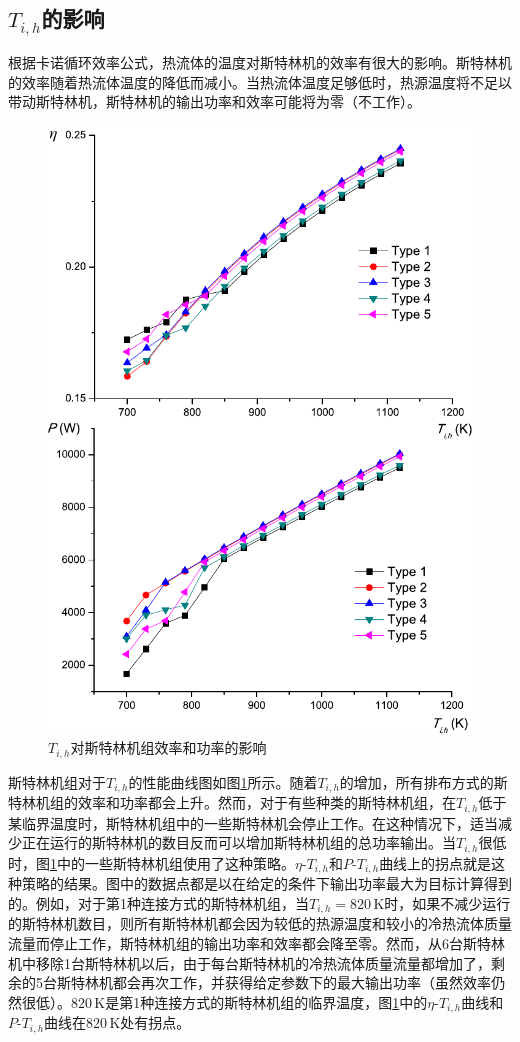 \subsection{$T_{i,h}$的影响}
\label{sec:T_i_h}
根据卡诺循环效率公式，热流体的温度对斯特林机的效率有很大的影响。斯特林机的效率随着热流体温度的降低而减小。当热流体温度足够低时，热源温度将不足以带动斯特林机，斯特林机的输出功率和效率可能将为零（不工作）。
\begin{figure}[htpb]
\begin{center}
	\includegraphics[width = 0.7\columnwidth]{fig/T_ih}
	\caption{$T_{i,h}$对斯特林机组效率和功率的影响}
	\label{fig:Ti_h}
\end{center}
\end{figure}
斯特林机组对于$T_{i,h}$的性能曲线图如图\ref{fig:Ti_h}所示。随着$T_{i,h}$的增加，所有排布方式的斯特林机组的效率和功率都会上升。然而，对于有些种类的斯特林机组，在$T_{i,h}$低于某临界温度时，斯特林机组中的一些斯特林机会停止工作。在这种情况下，适当减少正在运行的斯特林机的数目反而可以增加斯特林机组的总功率输出。当$T_{i,h}$很低时，图\ref{fig:Ti_h}中的一些斯特林机组使用了这种策略。$\eta$-$T_{i,h}$和$P$-$T_{i,h}$曲线上的拐点就是这种策略的结果。图中的数据点都是以在给定的条件下输出功率最大为目标计算得到的。例如，对于第1种连接方式的斯特林机组，当$T_{i,h} = 820\,\mathrm{K}$时，如果不减少运行的斯特林机数目，则所有斯特林机都会因为较低的热源温度和较小的冷热流体质量流量而停止工作，斯特林机组的输出功率和效率都会降至零。然而，从6台斯特林机中移除1台斯特林机以后，由于每台斯特林机的冷热流体质量流量都增加了，剩余的5台斯特林机都会再次工作，并获得给定参数下的最大输出功率（虽然效率仍然很低）。$820\,\mathrm{K}$是第1种连接方式的斯特林机组的临界温度，图\ref{fig:Ti_h}中的$\eta$-$T_{i,h}$曲线和$P$-$T_{i,h}$曲线在$820\,\mathrm{K}$处有拐点。

